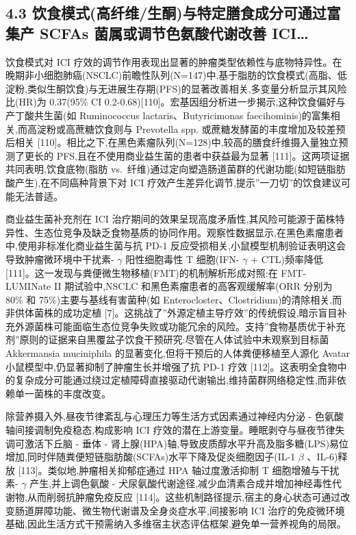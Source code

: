\documentclass[11pt]{article}
\begin{document}
\subsection{4.3 饮食模式(高纤维/生酮)与特定膳食成分可通过富集产 SCFAs 菌属或调节色氨酸代谢改善 ICI\ldots{}}\label{ux996eux98dfux6a21ux5f0fux9ad8ux7ea4ux7ef4ux751fux916eux4e0eux7279ux5b9aux81b3ux98dfux6210ux5206ux53efux901aux8fc7ux5bccux96c6ux4ea7-scfas-ux83ccux5c5eux6216ux8c03ux8282ux8272ux6c28ux9178ux4ee3ux8c22ux6539ux5584-ici}

饮食模式对 ICI 疗效的调节作用表现出显著的肿瘤类型依赖性与底物特异性。在晚期非小细胞肺癌(NSCLC)前瞻性队列(N=147)中,基于脂肪的饮食模式(高脂、低淀粉,类似生酮饮食)与无进展生存期(PFS)的显著改善相关,多变量分析显示其风险比(HR)为 0.37(95\% CI 0.2-0.68){[}110{]}。宏基因组分析进一步揭示,这种饮食偏好与产丁酸共生菌(如 Ruminococcus lactaris、Butyricimonas faecihominis)的富集相关,而高淀粉或高蔗糖饮食则与 Prevotella spp. 或蔗糖发酵菌的丰度增加及较差预后相关 {[}110{]}。相比之下,在黑色素瘤队列(N=128)中,较高的膳食纤维摄入量独立预测了更长的 PFS,且在不使用商业益生菌的患者中获益最为显著 {[}111{]}。这两项证据共同表明,饮食底物(脂肪 vs.~纤维)通过定向塑造肠道菌群的代谢功能(如短链脂肪酸产生),在不同癌种背景下对 ICI 疗效产生差异化调节,提示''一刀切''的饮食建议可能无法普适。

商业益生菌补充剂在 ICI 治疗期间的效果呈现高度矛盾性,其风险可能源于菌株特异性、生态位竞争及缺乏食物基质的协同作用。观察性数据显示,在黑色素瘤患者中,使用非标准化商业益生菌与抗 PD-1 反应受损相关,小鼠模型机制验证表明这会导致肿瘤微环境中干扰素- \(\gamma\) 阳性细胞毒性 T 细胞(IFN- \(\gamma\) + CTL)频率降低 {[}111{]}。这一发现与粪便微生物移植(FMT)的机制解析形成对照:在 FMT-LUMINate II 期试验中,NSCLC 和黑色素瘤患者的高客观缓解率(ORR 分别为 80\% 和 75\%)主要与基线有害菌种(如 Enterocloster、Clostridium)的清除相关,而非供体菌株的成功定植 {[}7{]}。这挑战了''外源定植主导疗效''的传统假设,暗示盲目补充外源菌株可能面临生态位竞争失败或功能冗余的风险。支持''食物基质优于补充剂''原则的证据来自黑覆盆子饮食干预研究:尽管在人体试验中未观察到目标菌 Akkermansia muciniphila 的显著变化,但将干预后的人体粪便移植至人源化 Avatar 小鼠模型中,仍显著抑制了肿瘤生长并增强了抗 PD-1 疗效 {[}112{]}。这表明全食物中的复杂成分可能通过绕过定植障碍直接驱动代谢输出,维持菌群网络稳定性,而非依赖单一菌株的丰度改变。

除营养摄入外,昼夜节律紊乱与心理压力等生活方式因素通过神经内分泌 - 色氨酸轴间接调制免疫稳态,构成影响 ICI 疗效的潜在上游变量。睡眠剥夺与昼夜节律失调可激活下丘脑 - 垂体 - 肾上腺(HPA)轴,导致皮质醇水平升高及脂多糖(LPS)易位增加,同时伴随粪便短链脂肪酸(SCFAs)水平下降及促炎细胞因子(IL-1 \(\beta\) 、IL-6)释放 {[}113{]}。类似地,肿瘤相关抑郁症通过 HPA 轴过度激活抑制 T 细胞增殖与干扰素- \(\gamma\) 产生,并上调色氨酸 - 犬尿氨酸代谢途径,减少血清素合成并增加神经毒性代谢物,从而削弱抗肿瘤免疫反应 {[}114{]}。这些机制路径提示,宿主的身心状态可通过改变肠道屏障功能、微生物代谢谱及全身炎症水平,间接影响 ICI 治疗的免疫微环境基础,因此生活方式干预需纳入多维宿主状态评估框架,避免单一营养视角的局限。
\end{document}
